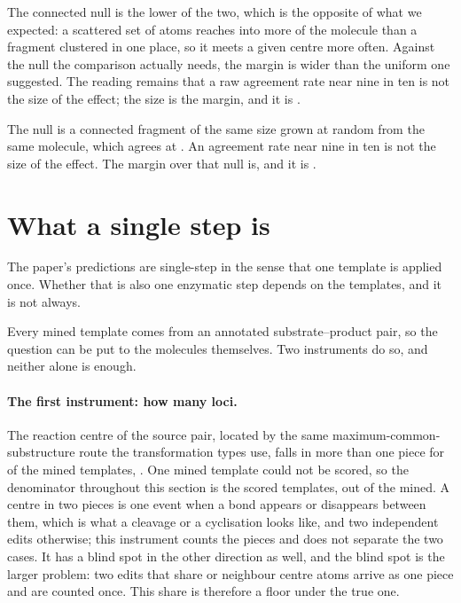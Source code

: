 \documentclass[journal=jcisd8,manuscript=suppinfo,layout=onecolumn]{achemso}
\begin{document}
The connected null is the lower of the two, which is the opposite of what we expected: a scattered
set of atoms reaches into more of the molecule than a fragment clustered in one
place, so it meets a given centre more often. Against the null the comparison actually needs, the
margin is wider than the uniform one suggested. The reading remains that a raw agreement rate near
nine in ten is not the size of the effect; the size is the margin, and it is
\numSiteConnectedmargin{}.


The null is a connected fragment of the same
size grown at random from the same molecule, which agrees at \numSiteConnectednullPct{}. An
agreement rate near nine in ten is not the size of the effect. The margin over that null is, and it
is \numSiteConnectedmargin{}.
\section{What a single step is}
\label{sec:si-singlestep}

The paper's predictions are single-step in the sense that one template is applied once. Whether
that is also one enzymatic step depends on the templates, and it is not always.

Every mined template comes from an annotated substrate--product pair, so the question can be put
to the molecules themselves. Two instruments do so, and neither alone is enough.

\paragraph{The first instrument: how many loci.} The reaction centre of the source pair, located
by the same maximum-common-substructure route the transformation types use, falls in more than one
piece for \numCompositeLoci{} of the \numCompositeScored{} mined templates,
\numCompositeLocisharePct{}. One mined template could not be scored, so the denominator throughout
this section is the \numCompositeScored{} scored templates, out of the \numMinedRules{} mined. A
centre in two pieces is one event when a bond appears or disappears between them, which is what a
cleavage or a cyclisation looks like, and two independent edits
otherwise; this instrument counts the pieces and does not separate the two cases. It has a blind
spot in the other direction as well, and the blind spot is the larger problem: two edits that
share or neighbour centre atoms arrive as one piece and are counted once. This share is therefore
a floor under the true one.
\end{document}
